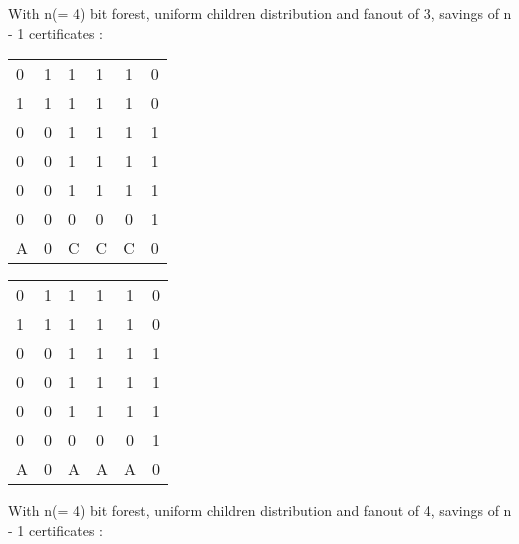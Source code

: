 With n(= 4) bit forest, uniform children distribution and fanout of 3, savings of n - 1 certificates :

\begin{multicols}{2}

	\begin{tabular}{ l l |l l c r }
	  0 & 1 & 1 & 1 & 1 & 0 \\
	  1 & 1 & 1 & 1 & 1 & 0 \\
	  \hline
	  0 & 0 & 1 & 1 & 1 & 1 \\
	  0 & 0 & 1 & 1 & 1 & 1 \\
	  0 & 0 & 1 & 1 & 1 & 1 \\
	  0 & 0 & 0 & 0 & 0 & 1 \\
	  \hline	
	  A & 0 & C & C & C & 0 \\
	\end{tabular}
\columnbreak{|}
	\begin{tabular}{ l l | l l c r }
	  0 & 1 & 1 & 1 & 1 & 0 \\
	  1 & 1 & 1 & 1 & 1 & 0 \\
	  \hline
	  0 & 0 & 1 & 1 & 1 & 1 \\
	  0 & 0 & 1 & 1 & 1 & 1 \\
	  0 & 0 & 1 & 1 & 1 & 1 \\
	  0 & 0 & 0 & 0 & 0 & 1 \\
	  \hline
	  A & 0 & A & A & A & 0\\

	\end{tabular}

\end{multicols}

With n(= 4) bit forest, uniform children distribution and fanout of 4, savings of n - 1 certificates :

